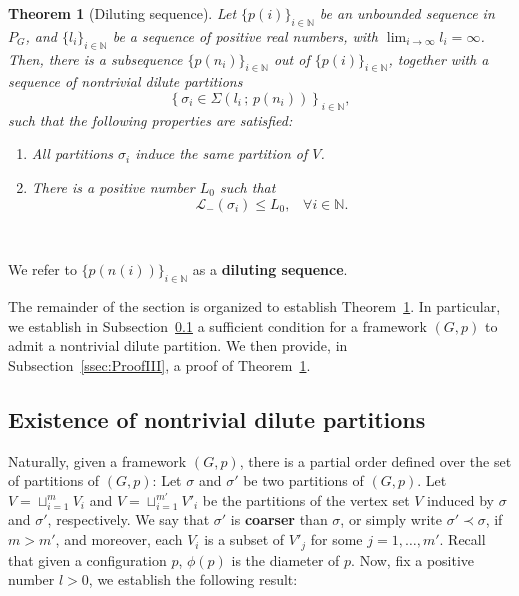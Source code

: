 \documentclass[10pt,twocolumn,twoside]{IEEEtran}
\newtheorem{theorem}{Theorem}
\renewcommand{\cal}{\mathcal}
\renewcommand{\(}{\left (}
\renewcommand{\)}{\right )}
\renewcommand{\;}{\,;\,}
\newcommand{\N}{\mathbb{N}}
\begin{document}
 
\begin{theorem}[Diluting sequence]\label{CCOSODC} 
Let $\{p(i)\}_{i\in\N}$ be an unbounded sequence in $P_G$,  
and $\{l_i\}_{i\in \N} $ be a sequence of positive real numbers, with $\lim_{i\to \infty} l_i = \infty $. 
Then, there is a subsequence $\{p(n_i)\}_{i\in\mathbb{N}}$ out of $\{p(i)\}_{i\in\N}$, together with a sequence of nontrivial dilute partitions 
$$\left \{\sigma_i\in \Sigma(l_i\; p(n_i)) \right \}_{ i\in\N},$$  
such that the following properties are satisfied: 
\begin{enumerate}
\item All partitions $\sigma_i$ induce the same partition of $V$.
\item There is a positive number $L_0$ such that
$$
\cal{L}_-(\sigma_i) \le L_0, \hspace{10pt} \forall i\in \mathbb{N}.   
$$
\end{enumerate}\, 
\end{theorem}

\noindent 
We refer to $\{p(n(i))\}_{i\in \mathbb{N}}$ as a {\bf diluting sequence}.    
\vspace{3pt}


The remainder of the section is organized to establish Theorem~\ref{CCOSODC}. In particular, 
we establish in Subsection~\ref{ssec:nontrivialclustering} a sufficient condition for a framework $(G,p)$ to admit a nontrivial dilute partition.  We then provide, in Subsection~\ref{ssec:ProofIII}, a proof of Theorem~\ref{CCOSODC}. 




\subsection{Existence of nontrivial dilute partitions}\label{ssec:nontrivialclustering}

Naturally, given a framework $(G,p)$,  there is a partial order defined over the set of partitions of $(G,p)$:  Let $\sigma$ and $\sigma'$ be two partitions of $(G,p)$. Let  
$V = \sqcup^m_{i = 1} V_i$ and  $V = \sqcup^{m'}_{i = 1} V'_i$ 
be the partitions of the vertex set $V$ induced by $\sigma$ and $\sigma'$, respectively. We say that $\sigma'$ is {\bf coarser} than $\sigma$, or simply write $\sigma' \prec \sigma$, if $m > m'$, and moreover, each $V_i$ is a subset of $V'_j$ for some $j = 1,\ldots, m'$.   
Recall that given a configuration $p$,  $\phi(p)$ is the diameter of $p$. Now, fix a positive number $l>0$, we establish the following result:  
\end{document}
